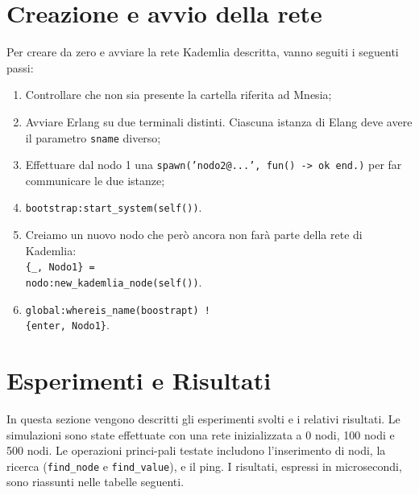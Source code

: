 \documentclass{article}
\begin{document}
\section{Creazione e avvio della rete}
Per creare da zero e avviare la rete Kademlia descritta, vanno seguiti i seguenti passi:
\begin{enumerate}
    \item Controllare che non sia presente la cartella riferita ad Mnesia;
    \item Avviare Erlang su due terminali distinti. Ciascuna istanza di Elang deve avere il parametro \texttt{sname} diverso;
    \item Effettuare dal nodo 1 una \texttt{spawn('nodo2@...', fun() -> ok end.)} per far communicare le due istanze;
    \item \texttt{bootstrap:start\_system(self())}.
    \item Creiamo un nuovo nodo che però ancora non farà parte della rete di Kademlia:\\ \texttt{\{\_, Nodo1\} =\\nodo:new\_kademlia\_node(self())}.
    \item \texttt{global:whereis\_name(boostrapt) ! \\ \{enter, Nodo1\}}.
\end{enumerate}
\section{Esperimenti e Risultati}
In questa sezione vengono descritti gli esperimenti svolti e i relativi risultati. Le simulazioni sono state effettuate con una rete inizializzata a 0 nodi, 100 nodi e 500 nodi. Le operazioni princi-pali testate includono l'inserimento di nodi, la ricerca (\texttt{find\_node} e \texttt{find\_value}), e il ping. I risultati, espressi in microsecondi, sono riassunti nelle tabelle seguenti.
\end{document}

